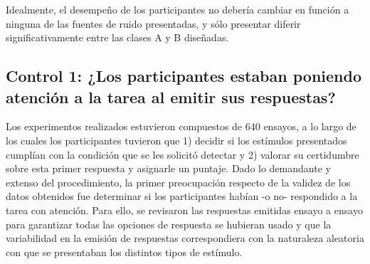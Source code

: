 Idealmente, el desempeño de los participantes no debería cambiar en función a ninguna de las fuentes de ruido presentadas, y sólo presentar diferir significativamente entre las clases A y B diseñadas.\\












\subsection{Control 1: ¿Los participantes estaban poniendo atención a la tarea al emitir sus respuestas?}

Los experimentos realizados estuvieron compuestos de 640 ensayos, a lo largo de los cuales los participantes tuvieron que 1) decidir si los estímulos presentados cumplían con la condición que se les solicitó detectar y 2) valorar su certidumbre sobre esta primer respuesta y asignarle un puntaje. Dado lo demandante y extenso del procedimiento, la primer preocupación respecto de la validez de los datos obtenidos fue determinar si los participantes habían -o no- respondido a la tarea con atención. Para ello, se revisaron las respuestas emitidas ensayo a ensayo para garantizar todas las opciones de respuesta se hubieran usado y que la variabilidad en la emisión de respuestas correspondiera con la naturaleza aleatoria con que se presentaban los distintos tipos de estímulo.\\

